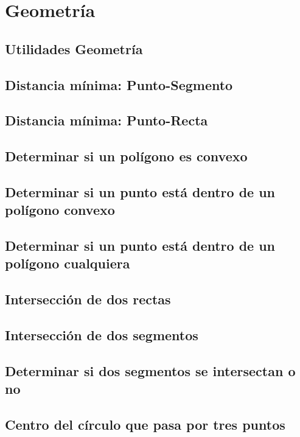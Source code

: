 \documentclass[10pt,letterpaper,twocolumn,twosided]{article}
\begin{document}
\section{Geometría}

\subsection{Utilidades Geometría}

\subsection{Distancia mínima: Punto-Segmento}

\subsection{Distancia mínima: Punto-Recta}

\subsection{Determinar si un polígono es convexo}

\subsection{Determinar si un punto está dentro de un polígono convexo}

\subsection{Determinar si un punto está dentro de un polígono cualquiera}

\subsection{Intersección de dos rectas}

\subsection{Intersección de dos segmentos}

\subsection{Determinar si dos segmentos se intersectan o no}

\subsection{Centro del círculo que pasa por tres puntos}
\end{document}
